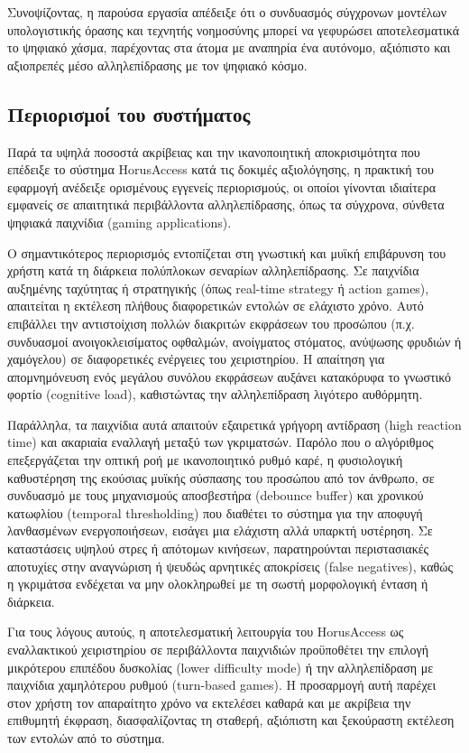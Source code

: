 \documentclass[twoside, a4paper, 11pt]{article}
\begin{document}
Συνοψίζοντας, η παρούσα εργασία απέδειξε ότι ο συνδυασμός σύγχρονων μοντέλων υπολογιστικής όρασης και τεχνητής νοημοσύνης μπορεί να γεφυρώσει αποτελεσματικά το ψηφιακό χάσμα, παρέχοντας στα άτομα με αναπηρία ένα αυτόνομο, αξιόπιστο και αξιοπρεπές μέσο αλληλεπίδρασης με τον ψηφιακό κόσμο.
\subsection{Περιορισμοί του συστήματος}

Παρά τα υψηλά ποσοστά ακρίβειας και την ικανοποιητική αποκρισιμότητα που επέδειξε το σύστημα HorusAccess κατά τις δοκιμές αξιολόγησης, η πρακτική του εφαρμογή ανέδειξε ορισμένους εγγενείς περιορισμούς, οι οποίοι γίνονται ιδιαίτερα εμφανείς σε απαιτητικά περιβάλλοντα αλληλεπίδρασης, όπως τα σύγχρονα, σύνθετα ψηφιακά παιχνίδια (gaming applications).

Ο σημαντικότερος περιορισμός εντοπίζεται στη γνωστική και μυϊκή επιβάρυνση του χρήστη κατά τη διάρκεια πολύπλοκων σεναρίων αλληλεπίδρασης. Σε παιχνίδια αυξημένης ταχύτητας ή στρατηγικής (όπως real-time strategy ή action games), απαιτείται η εκτέλεση πλήθους διαφορετικών εντολών σε ελάχιστο χρόνο. Αυτό επιβάλλει την αντιστοίχιση πολλών διακριτών εκφράσεων του προσώπου (π.χ. συνδυασμοί ανοιγοκλεισίματος οφθαλμών, ανοίγματος στόματος, ανύψωσης φρυδιών ή χαμόγελου) σε διαφορετικές ενέργειες του χειριστηρίου. Η απαίτηση για απομνημόνευση ενός μεγάλου συνόλου εκφράσεων αυξάνει κατακόρυφα το γνωστικό φορτίο (cognitive load), καθιστώντας την αλληλεπίδραση λιγότερο αυθόρμητη.

Παράλληλα, τα παιχνίδια αυτά απαιτούν εξαιρετικά γρήγορη αντίδραση (high reaction time) και ακαριαία εναλλαγή μεταξύ των γκριματσών. Παρόλο που ο αλγόριθμος επεξεργάζεται την οπτική ροή με ικανοποιητικό ρυθμό καρέ, η φυσιολογική καθυστέρηση της εκούσιας μυϊκής σύσπασης του προσώπου από τον άνθρωπο, σε συνδυασμό με τους μηχανισμούς αποσβεστήρα (debounce buffer) και χρονικού κατωφλίου (temporal thresholding) που διαθέτει το σύστημα για την αποφυγή λανθασμένων ενεργοποιήσεων, εισάγει μια ελάχιστη αλλά υπαρκτή υστέρηση. Σε καταστάσεις υψηλού στρες ή απότομων κινήσεων, παρατηρούνται περιστασιακές αποτυχίες στην αναγνώριση ή ψευδώς αρνητικές αποκρίσεις (false negatives), καθώς η γκριμάτσα ενδέχεται να μην ολοκληρωθεί με τη σωστή μορφολογική ένταση ή διάρκεια.

Για τους λόγους αυτούς, η αποτελεσματική λειτουργία του HorusAccess ως εναλλακτικού χειριστηρίου σε περιβάλλοντα παιχνιδιών προϋποθέτει την επιλογή μικρότερου επιπέδου δυσκολίας (lower difficulty mode) ή την αλληλεπίδραση με παιχνίδια χαμηλότερου ρυθμού (turn-based games). Η προσαρμογή αυτή παρέχει στον χρήστη τον απαραίτητο χρόνο να εκτελέσει καθαρά και με ακρίβεια την επιθυμητή έκφραση, διασφαλίζοντας τη σταθερή, αξιόπιστη και ξεκούραστη εκτέλεση των εντολών από το σύστημα.
\end{document}
